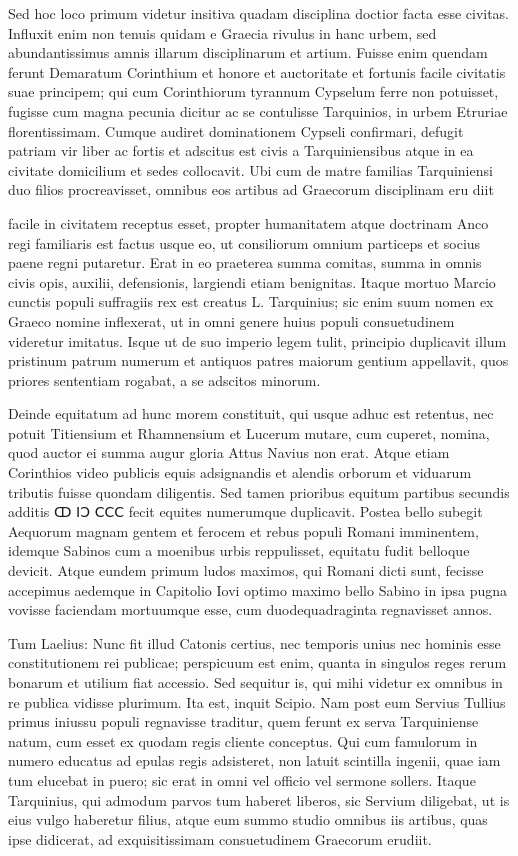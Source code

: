  Sed hoc loco primum videtur insitiva quadam disciplina doctior facta esse civitas. Influxit enim non tenuis quidam e Graecia rivulus in hanc urbem, sed abundantissimus amnis illarum disciplinarum et artium. Fuisse enim quendam ferunt Demaratum Corinthium et honore et auctoritate et fortunis facile civitatis suae principem; qui cum Corinthiorum tyrannum Cypselum ferre non potuisset, fugisse cum magna pecunia dicitur ac se contulisse Tarquinios, in urbem Etruriae florentissimam. Cumque audiret dominationem Cypseli confirmari, defugit patriam vir liber ac fortis et adscitus est civis a Tarquiniensibus atque in ea civitate domicilium et sedes collocavit. Ubi cum de matre familias Tarquiniensi duo filios procreavisset, omnibus eos artibus ad Graecorum disciplinam eru diit

 facile in civitatem receptus esset, propter humanitatem atque doctrinam Anco regi familiaris est factus usque eo, ut consiliorum omnium particeps et socius paene regni putaretur. Erat in eo praeterea summa comitas, summa in omnis civis opis, auxilii, defensionis, largiendi etiam benignitas. Itaque mortuo Marcio cunctis populi suffragiis rex est creatus L. Tarquinius; sic enim suum nomen ex Graeco nomine inflexerat, ut in omni genere huius populi consuetudinem videretur imitatus. Isque ut de suo imperio legem tulit, principio duplicavit illum pristinum patrum numerum et antiquos patres maiorum gentium appellavit, quos priores sententiam rogabat, a se adscitos minorum.

 Deinde equitatum ad hunc morem constituit, qui usque adhuc est retentus, nec potuit Titiensium et Rhamnensium et Lucerum mutare, cum cuperet, nomina, quod auctor ei summa augur gloria Attus Navius non erat. Atque etiam Corinthios video publicis equis adsignandis et alendis orborum et viduarum tributis fuisse quondam diligentis. Sed tamen prioribus equitum partibus secundis additis ↀ ⅠↃ ⅭⅭⅭ fecit equites numerumque duplicavit. Postea bello subegit Aequorum magnam gentem et ferocem et rebus populi Romani imminentem, idemque Sabinos cum a moenibus urbis reppulisset, equitatu fudit belloque devicit. Atque eundem primum ludos maximos, qui Romani dicti sunt, fecisse accepimus aedemque in Capitolio Iovi optimo maximo bello Sabino in ipsa pugna vovisse faciendam mortuumque esse, cum duodequadraginta regnavisset annos.

 Tum Laelius: Nunc fit illud Catonis certius, nec temporis unius nec hominis esse constitutionem rei publicae; perspicuum est enim, quanta in singulos reges rerum bonarum et utilium fiat accessio. Sed sequitur is, qui mihi videtur ex omnibus in re publica vidisse plurimum. Ita est, inquit Scipio. Nam post eum Servius Tullius primus iniussu populi regnavisse traditur, quem ferunt ex serva Tarquiniense natum, cum esset ex quodam regis cliente conceptus. Qui cum famulorum in numero educatus ad epulas regis adsisteret, non latuit scintilla ingenii, quae iam tum elucebat in puero; sic erat in omni vel officio vel sermone sollers. Itaque Tarquinius, qui admodum parvos tum haberet liberos, sic Servium diligebat, ut is eius vulgo haberetur filius, atque eum summo studio omnibus iis artibus, quas ipse didicerat, ad exquisitissimam consuetudinem Graecorum erudiit.

